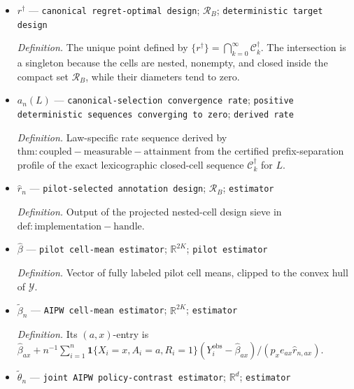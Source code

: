 \documentclass{article}
\begin{document}
\begin{itemize}
  \par\smallskip\noindent\emph{Definition.} \(\mathcal C_k^\dagger=\mathcal R_B\cap\mathcal D_k^\dagger\). At least one eligible child exists at every depth because the closed children cover the selected parent box and \(\mathcal C_k^\dagger\) contains a minimizer. Thus \(\mathcal C_{k+1}^\dagger\subseteq\mathcal C_k^\dagger\), every selected cell is nonempty and closed, and \(\operatorname{diam}(\mathcal C_k^\dagger)\le\sqrt{2K}(1-\rho)2^{-k}\to0\).
  \item \(r^\dagger\) --- \texttt{canonical regret-\allowbreak{}optimal design}; \(\mathcal R_B\); \texttt{deterministic target design}
  \par\smallskip\noindent\emph{Definition.} The unique point defined by \(\{r^\dagger\}=\bigcap_{k=0}^{\infty}\mathcal C_k^\dagger\). The intersection is a singleton because the cells are nested, nonempty, and closed inside the compact set \(\mathcal R_B\), while their diameters tend to zero.
  \item \(a_n(L)\) --- \texttt{canonical-\allowbreak{}selection convergence rate}; \texttt{positive deterministic sequences converging to zero}; \texttt{derived rate}
  \par\smallskip\noindent\emph{Definition.} Law-specific rate sequence derived by \(\mathrm{thm:coupled-measurable-attainment}\) from the certified prefix-separation profile of the exact lexicographic closed-cell sequence \(\mathcal C_k^\dagger\) for \(L\).
  \item \(\widehat r_n\) --- \texttt{pilot-\allowbreak{}selected annotation design}; \(\mathcal R_B\); \texttt{estimator}
  \par\smallskip\noindent\emph{Definition.} Output of the projected nested-cell design sieve in \(\mathrm{def:implementation-handle}\).
  \item \(\widehat\beta\) --- \texttt{pilot cell-\allowbreak{}mean estimator}; \(\mathbb R^{2K}\); \texttt{pilot estimator}
  \par\smallskip\noindent\emph{Definition.} Vector of fully labeled pilot cell means, clipped to the convex hull of \(\mathcal Y\).
  \item \(\widetilde\beta_n\) --- \texttt{AIPW cell-\allowbreak{}mean estimator}; \(\mathbb R^{2K}\); \texttt{estimator}
  \par\smallskip\noindent\emph{Definition.} Its \((a,x)\)-entry is \(\widehat\beta_{ax}+n^{-1}\sum_{i=1}^{n}\mathbf 1\{X_i=x,A_i=a,R_i=1\}(Y_i^{\mathrm{obs}}-\widehat\beta_{ax})/(p_xe_{ax}\widehat r_{n,ax})\).
  \item \(\widetilde\theta_n\) --- \texttt{joint AIPW policy-\allowbreak{}contrast estimator}; \(\mathbb R^d\); \texttt{estimator}

\end{itemize}
\end{document}
